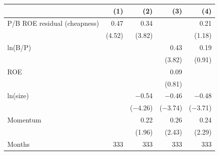 \begin{tabular}{lrrrr}
\toprule
 & (1) & (2) & (3) & (4) \\
\midrule
P/B ROE residual (cheapness) & 0.47 & 0.34 &  & 0.21 \\
 & (4.52) & (3.82) &  & (1.18) \\
ln(B/P) &  &  & 0.43 & 0.19 \\
 &  &  & (3.82) & (0.91) \\
ROE &  &  & 0.09 &  \\
 &  &  & (0.81) &  \\
ln(size) &  & \ensuremath{-}0.54 & \ensuremath{-}0.46 & \ensuremath{-}0.48 \\
 &  & (\ensuremath{-}4.26) & (\ensuremath{-}3.74) & (\ensuremath{-}3.71) \\
Momentum &  & 0.22 & 0.26 & 0.24 \\
 &  & (1.96) & (2.43) & (2.29) \\
\midrule
Months & 333 & 333 & 333 & 333 \\
\bottomrule
\end{tabular}
